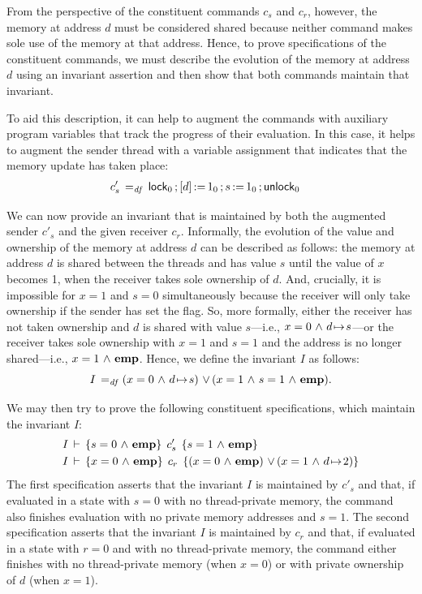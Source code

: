 \documentclass[11pt]{report}
\begin{document}
From the perspective of the constituent commands $c_s$ and $c_r$, however, the memory at address $d$ must be considered shared because neither command makes sole use of the memory at that address. Hence, to prove specifications of the constituent commands, we must describe the evolution of the memory at address $d$ using an invariant assertion and then show that both commands maintain that invariant. 

To aid this description, it can help to augment the commands with auxiliary program variables that track the progress of their evaluation. In this case, it helps to augment the sender thread with a variable assignment that indicates that the memory update has taken place: 
\begin{align*}
c'_s \operatorname{\;=_{\mathit{df}}\;} & \operatorname{\mathsf{lock}}_0 \operatorname{;} \left[ d \right] \operatorname{:\!=} 1_0 \operatorname{;} s \operatorname{:\!=} 1_0 \operatorname{;} \operatorname{\mathsf{unlock}}_0
\end{align*}

We can now provide an invariant that is maintained by both the augmented sender $c'_s$ and the given receiver $c_r$. Informally, the evolution of the value and ownership of the memory at address $d$ can be described as follows: the memory at address $d$ is shared between the threads and has value $s$ until the value of $x$ becomes 1, when the receiver takes sole ownership of $d$. And, crucially, it is impossible for $x = 1$ and $s = 0$ simultaneously because the receiver will only take ownership if the sender has set the flag. So, more formally, either the receiver has not taken ownership and $d$ is shared with value $s$---i.e., $x = 0 \operatorname{\,\wedge\,} d \!\mapsto\! s$---or the receiver takes sole ownership with $x = 1$ and $s = 1$ and the address is no longer shared---i.e., $x = 1 \operatorname{\,\wedge\,} \mathbf{emp}$. Hence, we define the invariant $I$ as follows: \[ I \operatorname{\;=_{\mathit{df}}\;} (x = 0 \operatorname{\,\wedge\,} d \!\mapsto\! s) \operatorname{\,\vee\,} (x = 1 \operatorname{\,\wedge\,} s = 1 \operatorname{\,\wedge\,} \mathbf{emp}).\]

We may then try to prove the following constituent specifications, which maintain the invariant $I$: \begin{align*}
  &I\,\vdash\,\left\lbrace s = 0 \operatorname{\,\wedge\,} \mathbf{emp} \right\rbrace\;c'_s\;\left\lbrace s = 1 \operatorname{\,\wedge\,} \mathbf{emp} \right\rbrace \\
  &I\,\vdash\,\left\lbrace x = 0 \operatorname{\,\wedge\,} \mathbf{emp} \right\rbrace\;c_r\;\left\lbrace (x = 0 \operatorname{\,\wedge\,} \mathbf{emp}) \operatorname{\,\vee\,} (x = 1 \operatorname{\,\wedge\,} d \!\mapsto\! 2) \right\rbrace
\end{align*} The first specification asserts that the invariant $I$ is maintained by $c'_s$ and that, if evaluated in a state with $s = 0$ with no thread-private memory, the command also finishes evaluation with no private memory addresses and $s = 1$. The second specification asserts that the invariant $I$ is maintained by $c_r$ and that, if evaluated in a state with $r = 0$ and with no thread-private memory, the command either finishes with no thread-private memory (when $x = 0$) or with private ownership of $d$ (when $x = 1$). 
\end{document}

